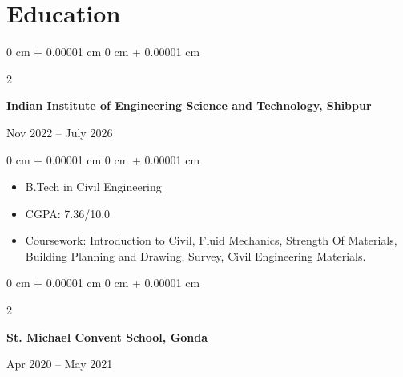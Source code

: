 \documentclass[10pt, letterpaper]{article}
\newenvironment{highlights}{
    \begin{itemize}[
        topsep=0.10 cm,
        parsep=0.10 cm,
        partopsep=0pt,
        itemsep=0pt,
        leftmargin=0 cm + 10pt
    ]
}{
    \end{itemize}
} %
\newenvironment{highlightsforbulletentries}{
    \begin{itemize}[
        topsep=0.10 cm,
        parsep=0.10 cm,
        partopsep=0pt,
        itemsep=0pt,
        leftmargin=10pt
    ]
}{
    \end{itemize}
} %
\newenvironment{onecolentry}{
    \begin{adjustwidth}{
        0 cm + 0.00001 cm
    }{
        0 cm + 0.00001 cm
    }
}{
    \end{adjustwidth}
} %
\newenvironment{twocolentry}[2][]{
    \onecolentry
    \def\secondColumn{#2}
    \setcolumnwidth{\fill, 4.5 cm}
    \begin{paracol}{2}
}{
    \switchcolumn \raggedleft \secondColumn
    \end{paracol}
    \endonecolentry
} %
\begin{document}
    









\section{Education}

\begin{twocolentry}{Nov 2022 – July 2026}
    \textbf{Indian Institute of Engineering Science and Technology, Shibpur}
\end{twocolentry}

\vspace{0.10 cm}
\begin{onecolentry}
    \begin{highlights}
        \item B.Tech in Civil Engineering
        \item  CGPA: 7.36/10.0
        \item Coursework: Introduction to Civil, Fluid Mechanics, Strength Of Materials, Building Planning and Drawing,
Survey, Civil Engineering Materials.
    \end{highlights}
\end{onecolentry}
\vspace{0.10 cm}
\begin{twocolentry}{Apr 2020 – May 2021}
    \textbf{St. Michael Convent School, Gonda}
\end{twocolentry}
\end{document}
